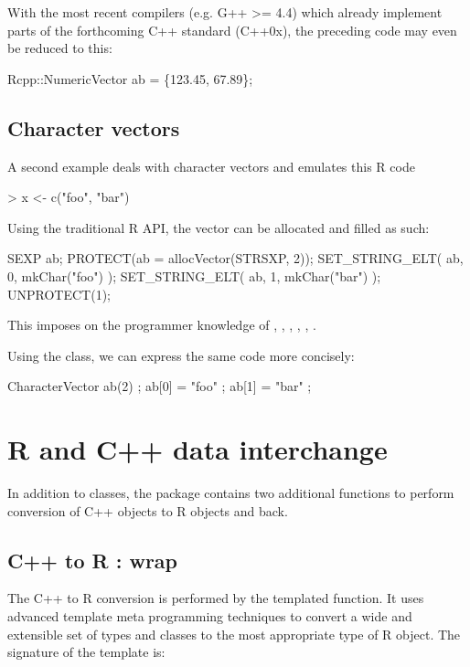 With the most recent compilers (e.g. G++ >= 4.4) which already implement
parts of the forthcoming C++ standard (C++0x), the preceding code may even be
reduced to this:

\begin{example}
Rcpp::NumericVector ab = \{123.45, 67.89\};
\end{example}

\subsection{Character vectors}

A second example deals with character vectors and emulates this R code

\begin{example}
> x <- c("foo", "bar")
\end{example}

Using the traditional R API, the vector can be allocated and filled as such:

\begin{example}
SEXP ab;
PROTECT(ab = allocVector(STRSXP, 2));
SET_STRING_ELT( ab, 0, mkChar("foo") );
SET_STRING_ELT( ab, 1, mkChar("bar") );
UNPROTECT(1);
\end{example}

This imposes on the programmer knowledge of , , 
, , , . 

Using the  class, we can express the same
code more concisely:

\begin{example}
CharacterVector ab(2) ;
ab[0] = "foo" ;
ab[1] = "bar" ;
\end{example}

\section{R and C++ data interchange}

In addition to classes, the  package contains two additional
functions to perform conversion of C++ objects to R objects and back. 

\subsection{C++ to R : wrap}

The C++ to R conversion is performed by the  templated 
function. It uses advanced template meta programming techniques
to convert a wide and extensible set of types and classes to the
most appropriate type of R object. The signature of the 
template is:

